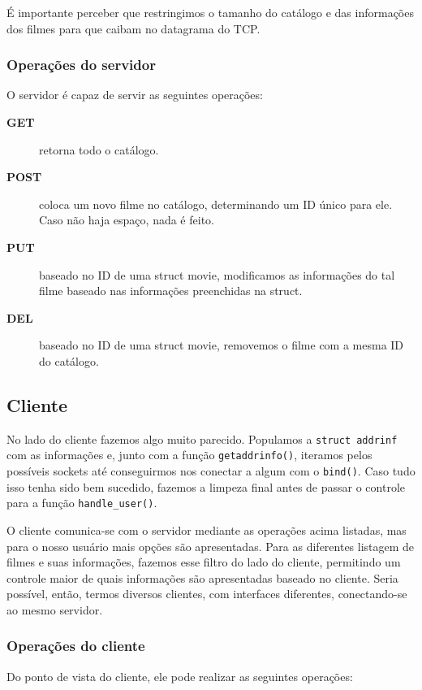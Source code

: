 \documentclass[11pt]{article}
\theoremstyle{definition}
\theoremstyle{definition}
\theoremstyle{remark}
\theoremstyle{remark}
\theoremstyle{remark}
\theoremstyle{remark}
\theoremstyle{definition}
\begin{document}
É importante perceber que restringimos o tamanho do catálogo e das informações dos filmes para que caibam no datagrama do TCP.

\subsubsection*{Operações do servidor}
\label{sec:orgcc3f2fe}
O servidor é capaz de servir as seguintes operações:
\begin{description}
\item[{\textbf{GET}}] retorna todo o catálogo.
\item[{\textbf{POST}}] coloca um novo filme no catálogo, determinando um ID único para ele. Caso não haja espaço, nada é feito.
\item[{\textbf{PUT}}] baseado no ID de uma struct movie, modificamos as informações do tal filme baseado nas informações preenchidas na struct.
\item[{\textbf{DEL}}] baseado no ID de uma struct movie, removemos o filme com a mesma ID do catálogo.
\end{description}


\subsection*{Cliente}
\label{sec:orgc6273f6}
No lado do cliente fazemos algo muito parecido. Populamos a \texttt{struct addrinf} com as informações e, junto com a função \texttt{getaddrinfo()}, iteramos pelos possíveis sockets até conseguirmos nos conectar a algum com o \texttt{bind()}. Caso tudo isso tenha sido bem sucedido, fazemos a limpeza final antes de passar o controle para a função \texttt{handle\_user()}.

O cliente comunica-se com o servidor mediante as operações acima listadas, mas para o nosso usuário mais opções são apresentadas. Para as diferentes listagem de filmes e suas informações, fazemos esse filtro do lado do cliente, permitindo um controle maior de quais informações são apresentadas baseado no cliente. Seria possível, então, termos diversos clientes, com interfaces diferentes, conectando-se ao mesmo servidor.

\subsubsection*{Operações do cliente}
\label{sec:orge10e7ce}
Do ponto de vista do cliente, ele pode realizar as seguintes operações:
\end{document}
